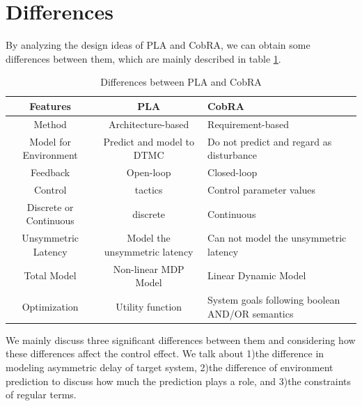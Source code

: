 \documentclass[sigconf]{acmart}
\begin{document}
\section{Differences}
By analyzing the design ideas of PLA  and CobRA, we can obtain some differences between them, which are mainly described in table \ref{tab:differences}.
\begin{table}
	\caption{Differences between PLA and CobRA}
	\label{tab:differences}
	\begin{tabular}{ccl}
		\toprule
		Features&PLA&CobRA\\
		\midrule
		Method & Architecture-based& Requirement-based\\
		Model for Environment & Predict and model to DTMC
		& Do not predict and regard as disturbance 
		\\
		Feedback & Open-loop
		 & Closed-loop\\
		Control  & tactics& Control parameter values
		\\
		Discrete or Continuous&discrete&Continuous\\
		Unsymmetric Latency&Model the unsymmetric latency&Can not model the unsymmetric latency
		\\
		Total Model&Non-linear MDP Model&Linear Dynamic Model\\
		Optimization&Utility function&System goals following boolean AND/OR semantics\\
		
		\bottomrule
	\end{tabular}
\end{table}
We mainly discuss three significant differences between them and considering how these differences affect the control effect. We talk about 1)the difference in modeling asymmetric delay of target system, 2)the difference of environment prediction to discuss how much the prediction plays a role, and 3)the constraints of regular terms.
\end{document}
